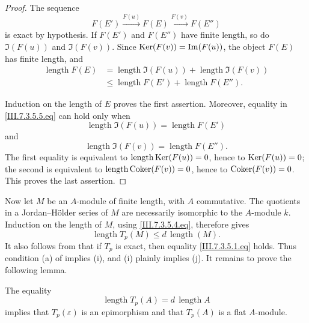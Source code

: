 \begin{proof}
The sequence
\[
  F(E')\xrightarrow{F(u)}F(E)\xrightarrow{F(v)}F(E'')
\]
is exact by hypothesis.  If $F(E')$ and $F(E'')$ have finite
length, so do $\Im(F(u))$ and $\Im(F(v))$.  Since
$\operatorname{Ker}(F(v))=\operatorname{Im}(F(u))$, the object $F(E)$ has finite length,
and
\[
  \begin{split}
  \operatorname{length}F(E)
  &=
  \operatorname{length}\Im(F(u))
  +
  \operatorname{length}\Im(F(v))
  \\
  &\leq
  \operatorname{length}F(E')
  +
  \operatorname{length}F(E'').
  \end{split}
  \tag{7.3.5.5}\label{III.7.3.5.5.eq}
\]


Induction on the length of $E$ proves the first assertion.
Moreover, equality in \eqref{III.7.3.5.5.eq} can hold only when
\[
  \operatorname{length}\Im(F(u))
  =
  \operatorname{length}F(E')
\]
and
\[
  \operatorname{length}\Im(F(v))
  =
  \operatorname{length}F(E'').
\]
The first equality is equivalent to
$\operatorname{length}\operatorname{Ker}(F(u))=0$, hence to $\operatorname{Ker}(F(u))=0$;
the second is equivalent to
$\operatorname{length}\operatorname{Coker}(F(v))=0$, hence to
$\operatorname{Coker}(F(v))=0$.  This proves the last assertion.
\end{proof}

Now let $M$ be an $A$-module of finite length, with $A$
commutative.  The quotients in a Jordan--H\"older series of
$M$ are necessarily isomorphic to the $A$-module $k$.
Induction on the length of $M$, using
\eqref{III.7.3.5.4.eq}, therefore gives
\[
  \operatorname{length}T_p(M)
  \leq
  d\,\operatorname{length}(M).
  \tag{7.3.5.6}\label{III.7.3.5.6.eq}
\]
It also follows from  that if $T_p$ is exact,
then equality \eqref{III.7.3.5.1.eq} holds.  Thus condition
(a) of  implies (i), and (i) plainly implies
(j).  It remains to prove the following lemma.

\begin{lemma}[7.3.5.7]
\label{III.7.3.5.7}
The equality
\[
  \operatorname{length}T_p(A)
  =
  d\,\operatorname{length}A
\]
implies that $T_p(\varepsilon)$ is an epimorphism and that
$T_p(A)$ is a flat $A$-module.
\end{lemma}

